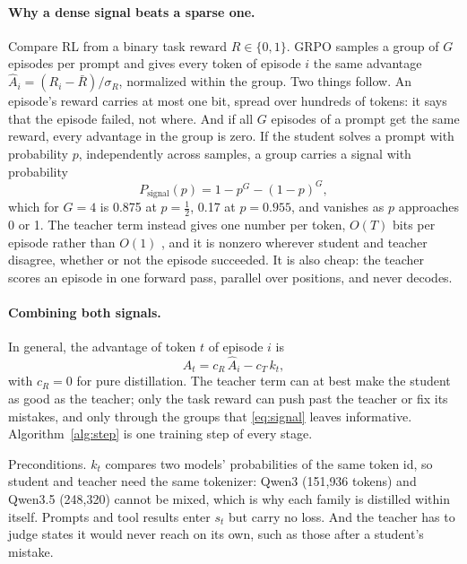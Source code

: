 \documentclass[11pt,a4paper]{article}
\begin{document}
\paragraph{Why a dense signal beats a sparse one.}
Compare RL from a binary task reward $R\in\{0,1\}$. GRPO samples a group of
$G$ episodes per prompt and gives every token of episode $i$ the same
advantage $\hat A_i=(R_i-\bar R)/\sigma_R$, normalized within the group. Two
things follow. An episode's reward carries at most one bit, spread over
hundreds of tokens: it says that the episode failed, not where. And if all
$G$ episodes of a prompt get the same reward, every advantage in the group
is zero. If the student solves a prompt with probability $p$, independently
across samples, a group carries a signal with probability
\begin{equation}
  P_{\text{signal}}(p) = 1 - p^G - (1-p)^G ,
  \label{eq:signal}
\end{equation}
which for $G=4$ is 0.875 at $p=\tfrac12$, 0.17 at $p=0.955$, and vanishes as
$p$ approaches 0 or 1. The teacher term instead gives one number per token,
$O(T)$ bits per episode rather than $O(1)$ \citep{lu2025onpolicy}, and it is
nonzero wherever student and teacher disagree, whether or not the episode
succeeded. It is also cheap: the teacher scores an episode in one forward
pass, parallel over positions, and never decodes.

\paragraph{Combining both signals.}
In general, the advantage of token $t$ of episode $i$ is
\begin{equation}
  A_t = c_R\,\hat A_i - c_T\,k_t ,
  \label{eq:advantage}
\end{equation}
with $c_R=0$ for pure distillation. The teacher term can at best make the
student as good as the teacher; only the task reward can push past the
teacher or fix its mistakes, and only through the groups that
\eqref{eq:signal} leaves informative. Algorithm~\ref{alg:step} is one
training step of every stage.

\begin{notebox}{Preconditions.}
$k_t$ compares two models' probabilities of the same token id, so student
and teacher need the same tokenizer: Qwen3 (151{,}936 tokens) and Qwen3.5
(248{,}320) cannot be mixed, which is why each family is distilled within
itself. Prompts and tool results enter $s_t$ but carry no loss. And the
teacher has to judge states it would never reach on its own, such as those
after a student's mistake.
\end{notebox}
\end{document}
